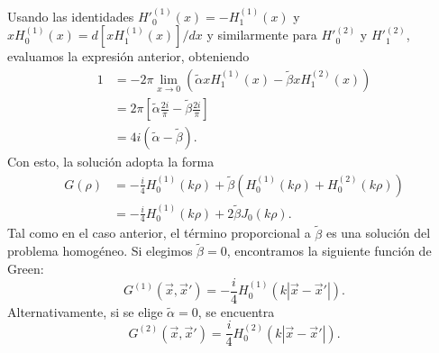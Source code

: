 Usando las identidades $H'^{(1)}_0(x)=-H_1^{(1)}(x)$ y $xH_0^{(1)}(x)=d[xH_1^{(1)}(x)]/dx$ y similarmente para $H'^{(2)}_0$ y $H'^{(2)}_1$, evaluamos la expresión anterior, obteniendo
\begin{align}
1 &= -2\pi\lim_{x\to 0}\left(\tilde\alpha xH_1^{(1)}(x)-\tilde\beta xH_1^{(2)}(x)\right) \\
&= 2\pi\left[\tilde\alpha\frac{2i}{\pi} -\tilde\beta\frac{2i}{\pi} \right]\\ 
&= 4i(\tilde\alpha -\tilde\beta).
\end{align}
Con esto, la solución adopta la forma
\begin{align}
G(\rho) &= -\frac{i}{4}H_0^{(1)}(k\rho)+\tilde\beta\left(H_0^{(1)}(k\rho)+H_0^{(2)}(k\rho)\right)\\
&= -\frac{i}{4}H_0^{(1)}(k\rho)+2\tilde\beta J_0(k\rho).
\end{align} 
Tal como en el caso anterior, el término proporcional a $\tilde\beta$ es una solución del problema homogéneo. Si elegimos $\tilde\beta=0$, encontramos la siguiente función de Green:
\begin{equation}
\boxed{G^{(1)}(\vec{x},\vec{x}') = -\frac{i}{4}H_0^{(1)}(k|\vec{x}-\vec{x}'|).}
\end{equation}
Alternativamente, si se elige $\tilde\alpha=0$, se encuentra
\begin{equation}
G^{(2)}(\vec{x},\vec{x}') = \frac{i}{4}H_0^{(2)}(k|\vec{x}-\vec{x}'|).
\end{equation}